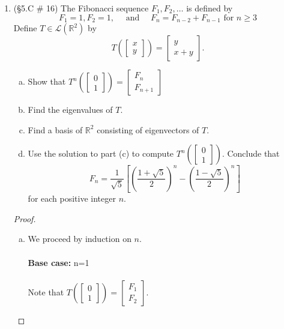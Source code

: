 \documentclass[12pt,letterpaper]{article}
\theoremstyle{plain}
\theoremstyle{definition}
\begin{document}
\begin{enumerate}[1.]
\begin{proof}
by a repeated application of our lemma.
\end{proof}
\item (\S 5.C \# 16) The Fibonacci sequence $F_1, F_2, \ldots$ is defined by 
\[F_1=1, F_2=1, \quad \text{ and }\quad F_n=F_{n-2}+F_{n-1} \text{ for }n\geq 3\]
Define $T\in \mathcal{L}(\mathbb{R}^2)$ by 
\[T \left( \left[\begin{array}{c}x\\y\end{array}\right]\right)=\left[\begin{array}{cc}y\\ x+y\end{array}\right].\]
\begin{enumerate}[(a)]
\item Show that $T^n\left(\left[\begin{array}{c}0\\1\end{array}\right]\right)=\left[\begin{array}{c}F_n\\F_{n+1}\end{array}\right]$
\item Find the eigenvalues of $T$.
\item Find a basis of $\mathbb{R}^2$ consisting of eigenvectors of $T$. 
\item Use the solution to part (c) to compute $T^n\left(\left[\begin{array}{c}0\\1\end{array}\right]\right)$. Conclude that 
\[F_n=\frac{1}{\sqrt{5}}\left[\left(\frac{1+\sqrt{5}}{2}\right)^n-\left(\frac{1-\sqrt{5}}{2}\right)^n\right]\]
for each positive integer $n$. 
\end{enumerate}
\begin{proof}
\ \\
\begin{enumerate}[(a)]
\item We proceed by induction on $n$. \\
\ \\
{\bf Base case: }n=1\\
 \ \\
 Note that $T\left(\left[\begin{array}{c}0\\1\end{array}\right]\right)=\left[\begin{array}{c}F_1\\F_{2}\end{array}\right]$.\\

\end{enumerate}
\end{proof}
\end{enumerate}
\end{document}
